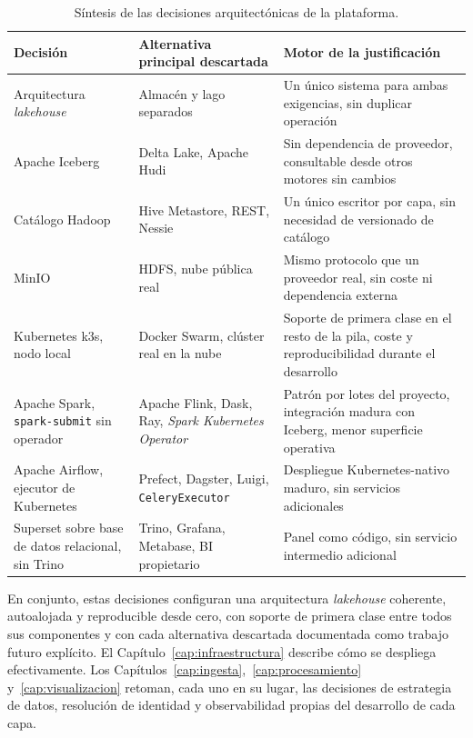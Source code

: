\begin{table}[H]
  \centering
  \small
  \renewcommand{\arraystretch}{1.2}
  \begin{tabular}{p{} p{} p{}}
    \hline
    \textbf{Decisión} & \textbf{Alternativa principal descartada} & \textbf{Motor de la justificación} \\
    \hline
    Arquitectura \textit{lakehouse} & Almacén y lago separados & Un único sistema para ambas exigencias, sin duplicar operación \\
    Apache Iceberg & Delta Lake, Apache Hudi & Sin dependencia de proveedor, consultable desde otros motores sin cambios \\
    Catálogo Hadoop & Hive Metastore, REST, Nessie & Un único escritor por capa, sin necesidad de versionado de catálogo \\
    MinIO & HDFS, nube pública real & Mismo protocolo que un proveedor real, sin coste ni dependencia externa \\
    Kubernetes k3s, nodo local & Docker Swarm, clúster real en la nube & Soporte de primera clase en el resto de la pila, coste y reproducibilidad durante el desarrollo \\
    Apache Spark, \texttt{spark-submit} sin operador & Apache Flink, Dask, Ray, \textit{Spark Kubernetes Operator} & Patrón por lotes del proyecto, integración madura con Iceberg, menor superficie operativa \\
    Apache Airflow, ejecutor de Kubernetes & Prefect, Dagster, Luigi, \texttt{CeleryExecutor} & Despliegue Kubernetes-nativo maduro, sin servicios adicionales \\
    Superset sobre base de datos relacional, sin Trino & Trino, Grafana, Metabase, BI propietario & Panel como código, sin servicio intermedio adicional \\
    \hline
  \end{tabular}
  \caption{Síntesis de las decisiones arquitectónicas de la plataforma.}
  \label{tab:tfm_sintesis_decisiones}
\end{table}

En conjunto, estas decisiones configuran una arquitectura \textit{lakehouse}
coherente, autoalojada y reproducible desde cero, con soporte de primera
clase entre todos sus componentes y con cada alternativa descartada
documentada como trabajo futuro explícito. El
Capítulo~\ref{cap:infraestructura} describe cómo se despliega
efectivamente. Los Capítulos~\ref{cap:ingesta},~\ref{cap:procesamiento}
y~\ref{cap:visualizacion} retoman, cada uno en su lugar, las decisiones de
estrategia de datos, resolución de identidad y observabilidad propias del
desarrollo de cada capa.
